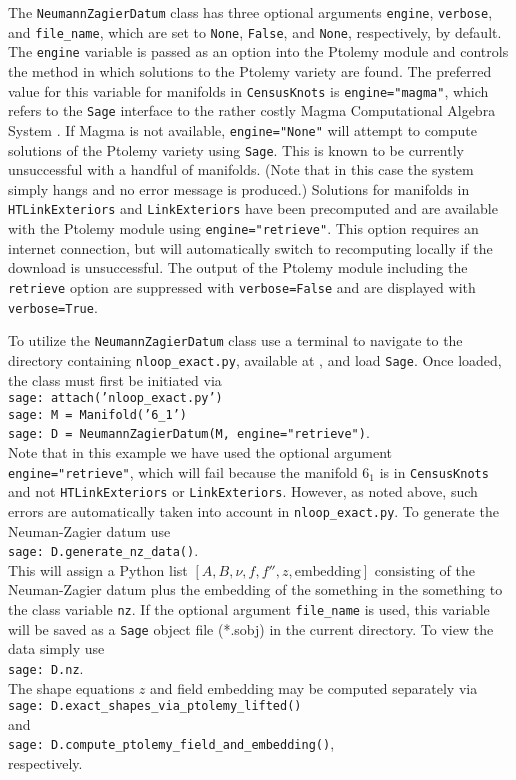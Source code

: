 \documentclass[12pt]{amsart}
\theoremstyle{definition}
\begin{document}
The \texttt{NeumannZagierDatum} class has three optional arguments
\texttt{engine}, \texttt{verbose}, and \texttt{file\_name}, which are set to \texttt{None},
\texttt{False}, and \texttt{None}, respectively, by default. The \texttt{engine} variable
is passed as an option into the Ptolemy module and controls the method in which
solutions to the Ptolemy variety are found. The preferred value for this variable for
manifolds in \texttt{CensusKnots} is \texttt{engine="magma"}, which refers to the
\texttt{Sage} interface to the rather costly Magma Computational Algebra System
\cite{citation to http://magma.maths.usyd.edu.au/magma/ here}.
If Magma is not available, \texttt{engine="None"} will attempt to compute solutions
of the Ptolemy variety using \texttt{Sage}. This is known to be currently
unsuccessful with a handful of manifolds. (Note that in this case the system simply
hangs and no error message is produced.) Solutions for manifolds in
\texttt{HTLinkExteriors} and \texttt{LinkExteriors} have been precomputed and
are available with the Ptolemy module using \texttt{engine="retrieve"}. This option
requires an internet connection, but will automatically switch to recomputing locally
if the download is unsuccessful. The output of the Ptolemy module including the
\texttt{retrieve} option are suppressed with \texttt{verbose=False} and are
displayed with \texttt{verbose=True}.

To utilize the \texttt{NeumannZagierDatum} class use a terminal to navigate to
the directory containing \texttt{nloop\_exact.py}, available at \cite{website}, and
load \texttt{Sage}. Once loaded, the class must first be initiated via\\
\indent \texttt{sage: attach('nloop\_exact.py')\\
\indent	     sage: M = Manifold('6\_1')\\
\indent	     sage: D = NeumannZagierDatum(M, engine="retrieve")}.\\
Note that in this example we have used the optional argument
\texttt{engine="retrieve"}, which will fail because the manifold $6_1$ is in
\texttt{CensusKnots} and not \texttt{HTLinkExteriors} or \texttt{LinkExteriors}.
However, as noted above, such errors are automatically taken into account in
\texttt{nloop\_exact.py}. To generate the Neuman-Zagier datum use\\
\indent \texttt{sage: D.generate\_nz\_data()}.\\
This will assign a Python list $[A,B,\nu,f,f'',z, \text{embedding}]$ consisting of
the Neuman-Zagier datum plus the embedding of the something in the
something to the class variable \texttt{nz}. If the optional argument
\texttt{file\_name} is used, this variable will be saved as a \texttt{Sage} object
file (*.sobj) in the current directory. To view the data simply use\\
\indent \texttt{sage: D.nz}.\\
The shape equations $z$ and field embedding may be computed separately
via\\
\indent \texttt{sage: D.exact\_shapes\_via\_ptolemy\_lifted()}\\
and\\
\indent \texttt{sage: D.compute\_ptolemy\_field\_and\_embedding()},\\
respectively.
\end{document}
